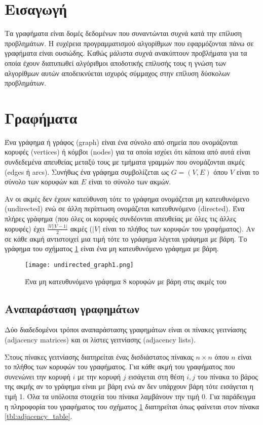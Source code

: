 \section{Εισαγωγή}
Τα γραφήματα είναι δομές δεδομένων που συναντώνται συχνά κατά την επίλυση προβλημάτων. Η ευχέρεια προγραμματισμού αλγορίθμων που εφαρμόζονται πάνω σε γραφήματα είναι ουσιώδης. Καθώς μάλιστα συχνά ανακύπτουν προβλήματα για τα οποία έχουν διατυπωθεί αλγόριθμοι αποδοτικής επίλυσής τους η γνώση των αλγορίθμων αυτών αποδεικνύεται ισχυρός σύμμαχος στην επίλυση δύσκολων προβλημάτων. 

\section{Γραφήματα}
Ένα γράφημα ή γράφος (graph) είναι ένα σύνολο από σημεία που ονομάζονται κορυφές (vertices) ή κόμβοι (nodes) για τα οποία ισχύει ότι κάποια από αυτά είναι συνδεδεμένα απευθείας μεταξύ τους με τμήματα γραμμών που ονομάζονται ακμές (edges ή arcs). Συνήθως ένα γράφημα συμβολίζεται ως $G=(V,E)$ όπου $V$ είναι το σύνολο των κορυφών και $E$ είναι το σύνολο των ακμών.

Αν οι ακμές δεν έχουν κατεύθυνση τότε το γράφημα ονομάζεται μη κατευθυνόμενο (undirected) ενώ σε άλλη περίπτωση ονομάζεται κατευθυνόμενο (directed). Ένα πλήρες γράφημα (που όλες οι κορυφές συνδέονται απευθείας με όλες τις άλλες κορυφές) έχει $\frac{|V||V-1|}{2}$ ακμές ($|V|$ είναι το πλήθος των κορυφών του γραφήματος). Αν σε κάθε ακμή αντιστοιχεί μια τιμή τότε το γράφημα λέγεται γράφημα με βάρη. Το γράφημα του σχήματος \ref{fig:undirected_graph} είναι ένα μη κατευθυνόμενο γράφημα με βάρη.

\begin{figure}[ht]
\centering
\texttt{[image: undirected\_graph1.png]}
\caption{Ένα μη κατευθυνόμενο γράφημα 8 κορυφών με βάρη στις ακμές του}
\label{fig:undirected_graph}
\end{figure}

\subsection{Αναπαράσταση γραφημάτων}
Δύο διαδεδομένοι τρόποι αναπαράστασης γραφημάτων είναι οι πίνακες γειτνίασης (adjacency matrices) και οι λίστες γειτνίασης (adjacency lists).

Στους πίνακες γειτνίασης διατηρείται ένας δισδιάστατος πίνακας $n \times n$ όπου $n$ είναι το πλήθος των κορυφών του γραφήματος. Για κάθε ακμή του γραφήματος που συνενώνει την κορυφή $i$ με την κορυφή $j$ εισάγεται στη θέση $i,j$ του πίνακα το βάρος της ακμής αν το γράφημα είναι με βάρη ενώ αν δεν υπάρχουν βάρη τότε εισάγεται η τιμή 1. Όλα τα υπόλοιπα στοιχεία του πίνακα λαμβάνουν την τιμή 0. Για παράδειγμα η πληροφορία του γραφήματος του σχήματος \ref{fig:undirected_graph} διατηρείται όπως φαίνεται στον πίνακα \ref{tbl:adjacency_table}.

